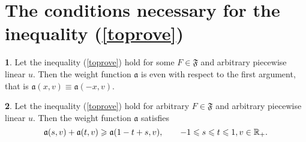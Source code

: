 \section{The conditions necessary for the inequality (\ref{toprove})}

\begin{thm}
\label{necessary}
{\bf 1}. Let the inequality (\ref{toprove}) hold for some $F \in \mathfrak {F}$
and arbitrary piecewise linear $u$. Then the weight function $\mathfrak a$ is even with respect to the first argument,
that is $\mathfrak a(x, v) \equiv \mathfrak a(-x, v)$.

{\bf 2}. Let the inequality (\ref{toprove}) hold for arbitrary $F \in \mathfrak{F}$
and arbitrary piecewise linear $u$. Then the weight function $\mathfrak a$ satisfies
\begin{equation}
\label{almostConcave}
\mathfrak a(s, v) + \mathfrak a(t, v) \ge \mathfrak a(1 - t + s, v), \qquad -1 \le s \le t \le 1, v \in \Real_+.
\end{equation}
\end{thm}

